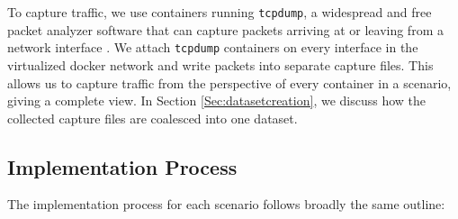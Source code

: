 To capture traffic, we use containers running \texttt{tcpdump}, a widespread and free packet analyzer software that can capture packets arriving at or leaving from a network interface \cite{jacobson1989tcpdump}.
We attach \texttt{tcpdump} containers on every interface in the virtualized docker network and write packets into separate capture files. This allows us to capture traffic from the perspective of every container in a scenario, giving a complete view. %
In Section \ref{Sec:datasetcreation}, we discuss how the collected capture files are coalesced into one dataset.


\subsection{Implementation Process}

The implementation process for each scenario follows broadly the same outline: 

